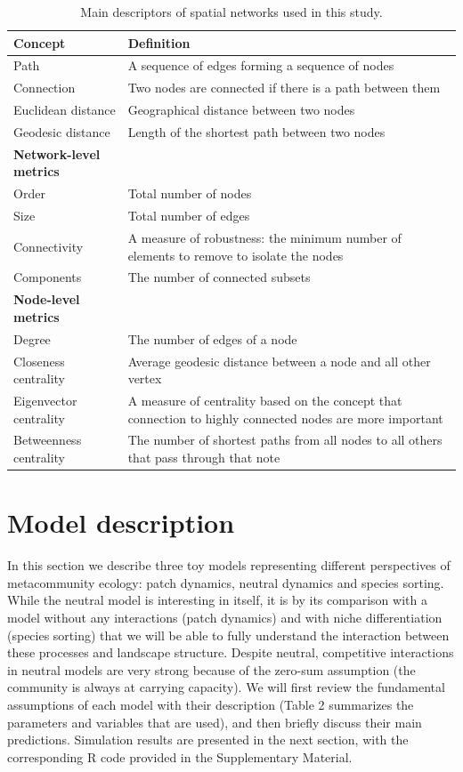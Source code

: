 \documentclass[12pt]{article}
\begin{document}
\begin{table}
	\centering
	\begin{tabular}{p{5cm}p{8cm}}
		\hline
		\textbf{Concept} & \textbf{Definition} \\
		\hline
		Path & A sequence of edges forming a sequence of nodes \\
		Connection & Two nodes are connected if there is a path between them \\
		Euclidean distance & Geographical distance between two nodes \\
		Geodesic distance & Length of the shortest path between two nodes \\

		\textbf{Network-level metrics} & \\
		Order & Total number of nodes \\
		Size & Total number of edges \\
		Connectivity & A measure of robustness: the minimum number of elements to remove to isolate the nodes \\
		Components &  The number of connected subsets\\

		\textbf{Node-level metrics} & \\
		Degree & The number of edges of a node \\
		Closeness centrality & Average geodesic distance between a node and all other vertex \\
		Eigenvector centrality & A measure of centrality based on the concept that connection to
		highly connected nodes are more important \\
		Betweenness centrality & The number of shortest paths from all nodes to all others that
		pass through that note \\
		\hline
	\end{tabular}
	\caption{Main descriptors of spatial networks used in this study.}
\end{table}

\section*{Model description}

In this section we describe three toy models representing different
perspectives of metacommunity ecology: patch dynamics, neutral dynamics and
species sorting. While the neutral model is interesting in itself, it is by its
comparison with a model without any interactions (patch dynamics) and with niche
differentiation (species sorting) that we will be able to fully understand the
interaction between these processes and landscape structure. Despite neutral,
competitive interactions in neutral models are very strong because of the
zero-sum assumption (the community is always at carrying capacity). We will
first review the fundamental assumptions of each model with their description
(Table 2 summarizes the parameters and variables that are used), and then
briefly discuss their main predictions. Simulation results are presented in the
next section, with the corresponding R code provided in the Supplementary
Material.
\end{document}
